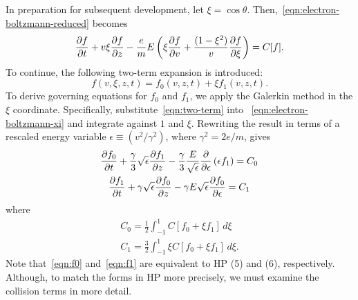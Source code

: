 In preparation for subsequent development, let $\xi = \cos \theta$.
Then,~\ref{eqn:electron-boltzmann-reduced} becomes
%
\begin{equation}
\frac{\partial f}{\partial t}
+
v \xi \frac{\partial f}{\partial z}
-
\frac{e}{m} E \left( \xi \frac{\partial f}{\partial v} + \frac{(1-\xi^2)}{v} \frac{\partial f}{\partial \xi} \right)
=
C[f].
\label{eqn:electron-boltzmann-xi}
\end{equation}
%
To continue, the following two-term expansion is introduced:
%
\begin{equation}
f(v, \xi, z, t) = f_0(v, z, t) + \xi f_1(v, z, t).
\label{eqn:two-term}
\end{equation}
%
To derive governing equations for $f_0$ and $f_1$, we apply the
Galerkin method in the $\xi$ coordinate.  Specifically,
substitute~\eqref{eqn:two-term} into
~\eqref{eqn:electron-boltzmann-xi} and integrate against $1$ and
$\xi$.  Rewriting the result in terms of a rescaled energy variable
$\epsilon \equiv (v^2 / \gamma^2)$, where $\gamma^2 = 2e / m$, gives
%
\begin{gather}
\pp{f_0}{t}
+
\frac{\gamma}{3} \sqrt{\epsilon} \pp{f_1}{z}
-
\frac{\gamma}{3} \frac{E}{\sqrt{\epsilon}} \pp{}{\epsilon} \left( \epsilon f_1 \right)
=
C_0
\label{eqn:f0}\\
%
\pp{f_1}{t}
+
\gamma \sqrt{\epsilon} \pp{f_0}{z}
-
\gamma E \sqrt{\epsilon} \pp{f_0}{\epsilon}
=
C_1
\label{eqn:f1}
\end{gather}
%
where
%
\begin{gather*}
C_0 = \frac{1}{2} \int_{-1}^{1} C[f_0 + \xi f_1] \, d\xi\\
C_1 = \frac{3}{2} \int_{-1}^{1} \xi C[f_0 + \xi f_1] \, d\xi.
\end{gather*}
%
Note that~\eqref{eqn:f0} and~\eqref{eqn:f1} are equivalent to HP (5)
and (6), respectively.  Although, to match the forms in HP more
precisely, we must examine the collision terms in more detail.
